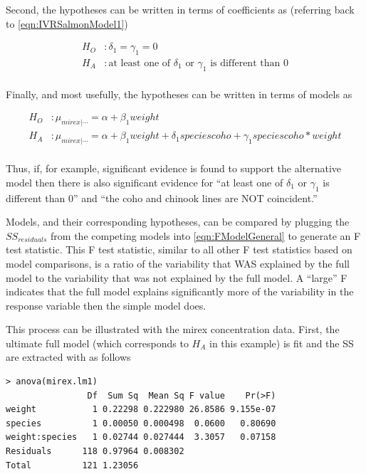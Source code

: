 \documentclass[10pt,openany]{book}\usepackage[]{graphicx}\usepackage[]{color}
\makeatletter
\newenvironment{kframe}{%
 \def\at@end@of@kframe{}%
 \ifinner\ifhmode%
  \def\at@end@of@kframe{\end{minipage}}%
  \begin{minipage}{\columnwidth}%
 \fi\fi%
 \def\FrameCommand##1{\hskip\@totalleftmargin \hskip-\fboxsep
 \colorbox{shadecolor}{##1}\hskip-\fboxsep
     \hskip-\linewidth \hskip-\@totalleftmargin \hskip\columnwidth}%
 \MakeFramed {\advance\hsize-\width
   \@totalleftmargin\z@ \linewidth\hsize
   \@setminipage}}%
 {\par\unskip\endMakeFramed%
 \at@end@of@kframe}
\newenvironment{knitrout}{}{} %
\makeatother
\begin{document}
Second, the hypotheses can be written in terms of coefficients as (referring back to \eqref{eqn:IVRSalmonModel1})

\[ \begin{split}
  H_{O}&: \delta_{1} = \gamma_{1} = 0 \\
  H_{A}&: \text{at least one of $\delta_{1}$ or $\gamma_{1}$ is different than 0} \\
\end{split} \]

Finally, and most usefully, the hypotheses can be written in terms of models as

\[ \begin{split}
  H_{O}&: \mu_{mirex|\cdots} = \alpha+\beta_{1}weight \\
  H_{A}&: \mu_{mirex|\cdots} = \alpha+\beta_{1}weight+\delta_{1}speciescoho+\gamma_{1}speciescoho*weight \\
\end{split} \]

Thus, if, for example, significant evidence is found to support the alternative model then there is also significant evidence for ``at least one of $\delta_{1}$ or $\gamma_{1}$ is different than 0'' and ``the coho and chinook lines are NOT coincident.''

Models, and their corresponding hypotheses, can be compared by plugging the $SS_{residuals}$ from the competing models into \eqref{eqn:FModelGeneral} to generate an F test statistic.  This F test statistic, similar to all other F test statistics based on model comparisons, is a ratio of the variability that WAS explained by the full model to the variability that was not explained by the full model.  A ``large'' F indicates that the full model explains significantly more of the variability in the response variable then the simple model does.

This process can be illustrated with the mirex concentration data.  First, the ultimate full model (which corresponds to $H_{A}$ in this example) is fit and the SS are extracted with  as follows

\begin{knitrout}
\color{fgcolor}\begin{kframe}
\begin{verbatim}
> anova(mirex.lm1)
                Df  Sum Sq  Mean Sq F value    Pr(>F)
weight           1 0.22298 0.222980 26.8586 9.155e-07
species          1 0.00050 0.000498  0.0600   0.80690
weight:species   1 0.02744 0.027444  3.3057   0.07158
Residuals      118 0.97964 0.008302                  
Total          121 1.23056                           
\end{verbatim}
\end{kframe}
\end{knitrout}
\end{document}
